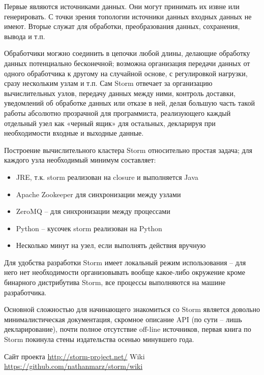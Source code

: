 \documentclass[10pt, a5paper]{article}
\begin{document}
Первые являются источниками данных. Они могут принимать их извне или генерировать. С точки зрения топологии источники данных входных данных не имеют.
Вторые служат для обработки, преобразования данных, сохранения, вывода и т.п.

Обработчики могжно соединить в цепочки любой длины, делающие обработку данных потенциально бесконечной; возможна организация передачи данных от одного обработчика к другому на случайной основе, с регулировкой нагрузки, сразу нескольким узлам и т.п.
Сам Storm отвечает за  организацию вычислительных узлов, передачу данных между ними, контроль доставки, уведомлений об обработке данных или отказе в ней, делая большую часть такой работы абсолютно прозрачной для программиста, реализующего каждый отдельный узел как «черный ящик» для остальных, декларируя при необходимости входные и выходные данные.

Построение вычислительного кластера Storm относительно простая задача; для каждого узла необходимый минимум составляет: 
\begin{itemize}
\item JRE, т.к. storm реализован на closure и выполняется Java
\item Apache Zookeeper для синхронизации между узлами
\item ZeroMQ  -- для синхронизации между процессами
\item Python – кусочек storm реализован на Python
\item Несколько минут на узел, если выполнять действия вручную
\end{itemize}


Для удобства разработки Storm имеет локальный режим использования – для него нет необходимости организовывать вообще какое-либо окружение кроме бинарного дистрибутива Storm, все процессы выполняются на машине разработчика.

Основной сложностью для начинающего знакомиться со Storm является довольно минималистическая документация, скромное \linebreak описание API (по сути – лишь декларирование), почти полное отсутствие off-line источников, первая книга по Storm покинула стены издательства осенью минувшего года.


\begin{thebibliography}{9}
 Сайт проекта \url{http://storm-project.net/}
 Wiki \url{https://github.com/nathanmarz/storm/wiki}
\end{thebibliography}
\end{document}
